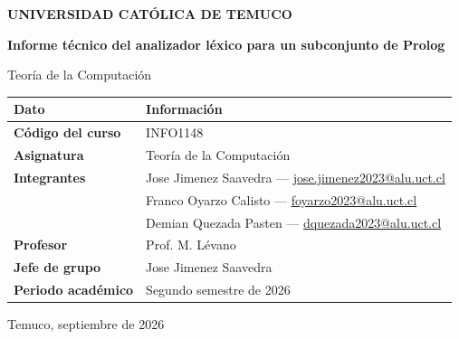 \begin{titlepage}
  \thispagestyle{fancy}
  \centering

  \vspace*{1.2cm}
  {\sffamily\bfseries\color{textgray} UNIVERSIDAD CATÓLICA DE TEMUCO\par}

  \vspace{2.6cm}
  {\sffamily\bfseries\LARGE Informe técnico del analizador léxico para un subconjunto de Prolog\par}
  \vspace{0.6cm}
  {\large Teoría de la Computación\par}

  \vspace{2.0cm}
  \begin{tabularx}{0.9\textwidth}{>{\bfseries\sffamily}L{3.7cm}Y}
    \toprule
    \color{white}Dato & \color{white}\bfseries\sffamily Información \\
    \midrule
    Código del curso & INFO1148 \\
     Asignatura & Teoría de la Computación \\
    Integrantes & Jose Jimenez Saavedra --- \href{mailto:jose.jimenez2023@alu.uct.cl}{jose.jimenez2023@alu.uct.cl} \\
    & Franco Oyarzo Calisto --- \href{mailto:foyarzo2023@alu.uct.cl}{foyarzo2023@alu.uct.cl} \\
    & Demian Quezada Pasten --- \href{mailto:dquezada2023@alu.uct.cl}{dquezada2023@alu.uct.cl} \\
     Profesor & Prof. M. Lévano \\
    Jefe de grupo & Jose Jimenez Saavedra \\
     Periodo académico & Segundo semestre de 2026 \\
    \bottomrule
  \end{tabularx}

  \vfill
  {\color{textgray}Temuco, septiembre de 2026\par}
\end{titlepage}
\setcounter{page}{2}
